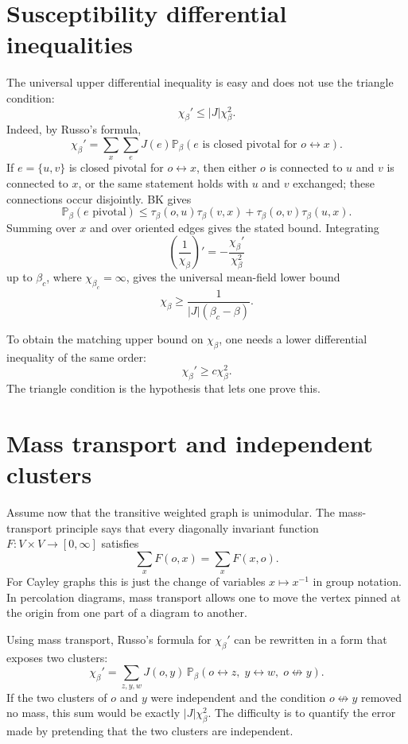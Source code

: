 \documentclass[11pt,reqno]{book}
\numberwithin{equation}{chapter}
\theoremstyle{plain}
\theoremstyle{definition}
\theoremstyle{remark}
\newcommand{\Pb}{\mathbb P_\beta}
\newcommand{\1}{\mathbf 1}
\begin{document}
\section{Susceptibility differential inequalities}

The universal upper differential inequality is easy and does not use the triangle condition:
\[
  \chi_\beta'\leq |J|\chi_\beta^2.
\]
Indeed, by Russo's formula,
\[
  \chi_\beta'
  =
  \sum_x\sum_eJ(e)\Pb(e\text{ is closed pivotal for }o\leftrightarrow x).
\]
If $e=\{u,v\}$ is closed pivotal for $o\leftrightarrow x$, then either $o$ is connected to $u$ and $v$ is connected to $x$, or the same statement holds with $u$ and $v$ exchanged; these connections occur disjointly. BK gives
\[
  \Pb(e\text{ pivotal})
  \leq
  \tau_\beta(o,u)\tau_\beta(v,x)
  +
  \tau_\beta(o,v)\tau_\beta(u,x).
\]
Summing over $x$ and over oriented edges gives the stated bound. Integrating
\[
\left(\frac1{\chi_\beta}\right)'
=-\frac{\chi_\beta'}{\chi_\beta^2}
\]
up to $\beta_c$, where $\chi_{\beta_c}=\infty$, gives the universal mean-field lower bound
\[
  \chi_\beta\geq \frac{1}{|J|(\beta_c-\beta)}.
\]

To obtain the matching upper bound on $\chi_\beta$, one needs a lower differential inequality of the same order:
\[
  \chi_\beta'\geq c\chi_\beta^2.
\]
The triangle condition is the hypothesis that lets one prove this.

\section{Mass transport and independent clusters}

Assume now that the transitive weighted graph is unimodular. The mass-transport principle says that every diagonally invariant function $F:V\times V\to[0,\infty]$ satisfies
\[
  \sum_x F(o,x)=\sum_x F(x,o).
\]
For Cayley graphs this is just the change of variables $x\mapsto x^{-1}$ in group notation. In percolation diagrams, mass transport allows one to move the vertex pinned at the origin from one part of a diagram to another.

Using mass transport, Russo's formula for $\chi_\beta'$ can be rewritten in a form that exposes two clusters:
\[
  \chi_\beta'
  =
  \sum_{z,y,w}J(o,y)\,
  \Pb(o\leftrightarrow z,\;y\leftrightarrow w,\;o\not\leftrightarrow y).
\]
If the two clusters of $o$ and $y$ were independent and the condition $o\not\leftrightarrow y$ removed no mass, this sum would be exactly $|J|\chi_\beta^2$. The difficulty is to quantify the error made by pretending that the two clusters are independent.
\end{document}
